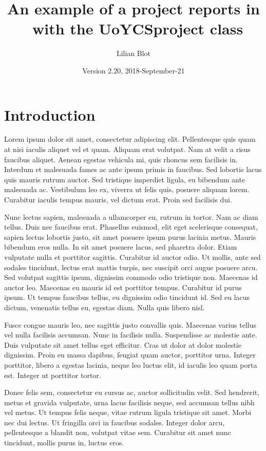 \documentclass{UoYCSproject}
\author{Lilian Blot}
\title{An example of a project reports in \LaTeXe\ with the   \textsf{UoYCSproject} class}
\date{Version 2.20, 2018-September-21}
\begin{document}
\maketitle
\listoffigures
\listoftables


\chapter{Introduction}
\label{cha:Introduction}
Lorem ipsum dolor sit amet, consectetur adipiscing elit. Pellentesque
quis quam at nisi iaculis aliquet vel et quam. Aliquam erat
volutpat. Nam at velit a risus faucibus aliquet. Aenean egestas
vehicula mi, quis rhoncus sem facilisis in. Interdum et malesuada
fames ac ante ipsum primis in faucibus. Sed lobortis lacus quis mauris
rutrum auctor. Sed tristique imperdiet ligula, eu bibendum ante
malesuada ac. Vestibulum leo ex, viverra ut felis quis, posuere
aliquam lorem. Curabitur iaculis tempus mauris, vel dictum erat. Proin
sed facilisis dui.

Nunc lectus sapien, malesuada a ullamcorper eu, rutrum in tortor. Nam
ac diam tellus. Duis nec faucibus erat. Phasellus euismod, elit eget
scelerisque consequat, sapien lectus lobortis justo, sit amet posuere
ipsum purus lacinia metus. Mauris bibendum eros nulla. In sit amet
posuere lacus, sed pharetra dolor. Etiam vulputate nulla et porttitor
sagittis. Curabitur id auctor odio. Ut mollis, ante sed sodales
tincidunt, lectus erat mattis turpis, nec suscipit orci augue posuere
arcu. Sed volutpat sagittis ipsum, dignissim commodo odio tristique
non. Maecenas id auctor leo. Maecenas eu mauris id est porttitor
tempus. Curabitur id purus ipsum. Ut tempus faucibus tellus, eu
dignissim odio tincidunt id. Sed eu lacus dictum, venenatis tellus eu,
egestas diam. Nulla quis libero nisl.

Fusce congue mauris leo, nec sagittis justo convallis quis. Maecenas
varius tellus vel nulla facilisis accumsan. Nunc in facilisis
nulla. Suspendisse ac molestie ante. Duis vulputate sit amet tellus
eget efficitur. Cras ut dolor at dolor molestie dignissim. Proin eu
massa dapibus, feugiat quam auctor, porttitor urna. Integer porttitor,
libero a egestas lacinia, neque leo luctus elit, id iaculis leo quam
porta est. Integer ut porttitor tortor.

Donec felis sem, consectetur eu cursus ac, auctor sollicitudin
velit. Sed hendrerit, metus et gravida vulputate, urna lacus facilisis
neque, sed accumsan tellus nibh vel metus. Ut tempus felis neque,
vitae rutrum ligula tristique sit amet. Morbi nec dui lectus. Ut
fringilla orci in faucibus sodales. Integer dolor arcu, pellentesque a
blandit non, volutpat vitae sem. Curabitur sit amet nunc tincidunt,
mollis purus in, luctus eros.
\end{document}
